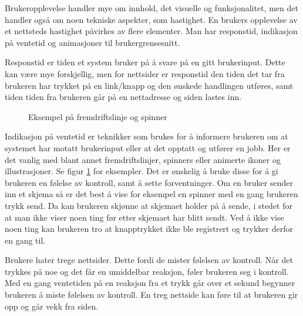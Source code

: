 Brukeropplevelse handler mye om innhold, det visuelle og funksjonalitet, men det handler også om noen tekniske aspekter, som hastighet. En brukers opplevelse av et nettsteds hastighet påvirkes av flere elementer. Man har responstid, indikasjon på ventetid og animasjoner til brukergrensesnitt.

Responstid er tiden et system bruker på å svare på en gitt brukerinput.
Dette kan være mye forskjellig, men for nettsider er responstid den tiden det tar fra brukeren har trykket på en link/knapp og den ønskede handlingen utføres, samt tiden tiden fra brukeren går på en nettadresse og siden lastes inn.

\begin{figure}[H]
    \centering
    \caption{Eksempel på fremdriftslinje og spinner}
    \label{fig:analysis-loading-indicators}
\end{figure}

Indikasjon på ventetid er teknikker som brukes for å informere brukeren om at systemet har motatt brukerinput eller at det opptatt og utfører en jobb. Her er det vanlig med blant annet fremdriftslinjer, spinners eller animerte ikoner og illustrasjoner. Se figur \ref{fig:analysis-loading-indicators} for eksempler.
Det er ønskelig å bruke disse for å gi brukeren en følelse av kontroll, samt å sette forventninger. Om en bruker sender inn et skjema så er det best å vise for eksempel en spinner med en gang brukeren trykk send. Da kan brukeren skjønne at skjemaet holder på å sende, i stedet for at man ikke viser noen ting før etter skjemaet har blitt sendt. Ved å ikke vise noen ting kan brukeren tro at knapptrykket ikke ble registrert og trykker derfor en gang til. 

Brukere hater trege nettsider. Dette fordi de mister følelsen av kontroll. Når det trykkes på noe og det får en umiddelbar reaksjon, føler brukeren seg i kontroll. Med en gang ventetiden på en reaksjon fra et trykk går over et sekund begynner brukeren å miste følelsen av kontroll. En treg nettside kan føre til at brukeren gir opp og går vekk fra siden.


